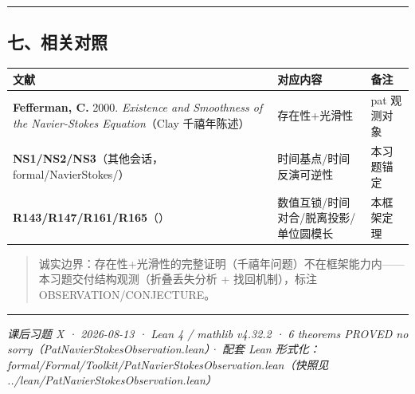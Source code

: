 \documentclass[
]{article}
\newcounter{none} %
\begin{document}
\begin{center}\rule{0.5\linewidth}{0.5pt}\end{center}

\subsection{七、相关对照}\label{ux4e03ux76f8ux5173ux5bf9ux7167}

{\def\LTcaptype{none} %
\begin{longtable}[]{@{}
 >{\raggedright\arraybackslash}p{}
 >{\raggedright\arraybackslash}p{}
 >{\raggedright\arraybackslash}p{}@{}}
\toprule\noalign{}
\begin{minipage}[b]{\linewidth}\raggedright
文献
\end{minipage} & \begin{minipage}[b]{\linewidth}\raggedright
对应内容
\end{minipage} & \begin{minipage}[b]{\linewidth}\raggedright
备注
\end{minipage} \\
\midrule\noalign{}
\endhead
\bottomrule\noalign{}
\endlastfoot
\textbf{Fefferman, C.} 2000. \emph{Existence and Smoothness of the
Navier-Stokes Equation}（Clay 千禧年陈述） & 存在性+光滑性 & pat
观测对象 \\
\textbf{NS1/NS2/NS3}（其他会话，formal/NavierStokes/） &
时间基点/时间反演可逆性 & 本习题锚定 \\
\textbf{R143/R147/R161/R165}（） &
数值互锁/时间对合/脱离投影/单位圆模长 & 本框架定理 \\
\end{longtable}
}

\begin{quote}
诚实边界：存在性+光滑性的完整证明（千禧年问题）不在框架能力内------本习题交付结构观测（折叠丢失分析
+ 找回机制），标注 OBSERVATION/CONJECTURE。
\end{quote}

\begin{center}\rule{0.5\linewidth}{0.5pt}\end{center}

\emph{课后习题 X · 2026-08-13 · Lean 4 / mathlib v4.32.2 · 6
theorems PROVED no sorry（PatNavierStokesObservation.lean）· 配套 Lean
形式化：formal/Formal/Toolkit/PatNavierStokesObservation.lean（快照见
../lean/PatNavierStokesObservation.lean）}
\end{document}
